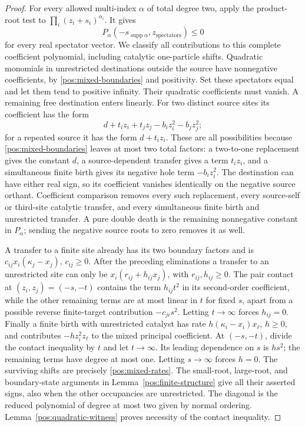 \documentclass[reqno]{amsart}
\theoremstyle{definition}
\theoremstyle{remark}
\DeclareMathOperator{\supp}{supp}
\begin{document}
\begin{proof}
For every allowed multi-index \(\alpha\) of total degree two, apply the product-root
test to \(\prod_i(z_i+s_i)^{\alpha_i}\).  It gives
\[
 P_\alpha(-s_{\supp\alpha},z_{\mathrm{spectators}})\le0
\]
for every real spectator vector.  We classify all contributions to this complete
coefficient polynomial, including catalytic one-particle shifts.
Quadratic monomials in unrestricted destinations outside the source
have nonnegative coefficients, by \eqref{pos:mixed-boundaries} and positivity.
Set these spectators equal and let them tend to positive infinity.  Their
quadratic coefficients must vanish.  A remaining free destination enters linearly.
For two distinct source sites its coefficient has the form
\[
 d+t_i z_i+t_jz_j-b_i z_i^2-b_jz_j^2;
\]
for a repeated source it has the form \(d+t_i z_i\).
These are all possibilities because \eqref{pos:mixed-boundaries} leaves at most
two total factors: a two-to-one replacement gives the constant \(d\),
a source-dependent transfer gives a term \(t_i z_i\), and a simultaneous finite
birth gives its negative hole term \(-b_i z_i^2\).
The destination can have either real sign, so its coefficient vanishes identically
on the negative source orthant.  Coefficient comparison removes every such
replacement, every source-self or third-site catalytic transfer, and every
simultaneous finite birth and unrestricted transfer.  A pure double death is the
remaining nonnegative constant in \(P_\alpha\); sending the negative source roots
to zero removes it as well.

A transfer to a finite site already has its two boundary factors and is
\(c_{ij}x_i(\kappa_j-x_j)\), \(c_{ij}\ge0\).
After the preceding eliminations a transfer to an unrestricted site can only be
\(x_i(r_{ij}+h_{ij}x_j)\), with \(r_{ij},h_{ij}\ge0\).
The pair contact at \((z_i,z_j)=(-s,-t)\) contains the term
\(h_{ij}t^2\) in its second-order coefficient, while the other remaining terms
are at most linear in \(t\) for fixed \(s\), apart from a possible reverse
finite-target contribution \(-c_{ji}s^2\).
Letting \(t\to\infty\) forces \(h_{ij}=0\).
Finally a finite birth with unrestricted catalyst has rate
\(h(\kappa_i-x_i)x_\ell\), \(h\ge0\), and contributes
\(-h z_i^2z_\ell\) to the mixed principal coefficient.
At \((-s,-t)\), divide the contact inequality by \(t\) and let \(t\to\infty\).
Its leading dependence on \(s\) is \(hs^2\); the remaining terms have degree
at most one.  Letting \(s\to\infty\) forces \(h=0\).
The surviving shifts are precisely \eqref{pos:mixed-rates}.
The small-root, large-root, and boundary-state arguments in
Lemma~\ref{pos:finite-structure} give all their asserted signs, also when the
other occupancies are unrestricted.  The diagonal is the reduced polynomial
of degree at most two given by normal ordering.
Lemma~\ref{pos:quadratic-witness} proves necessity of the contact inequality.


\end{proof}
\end{document}
